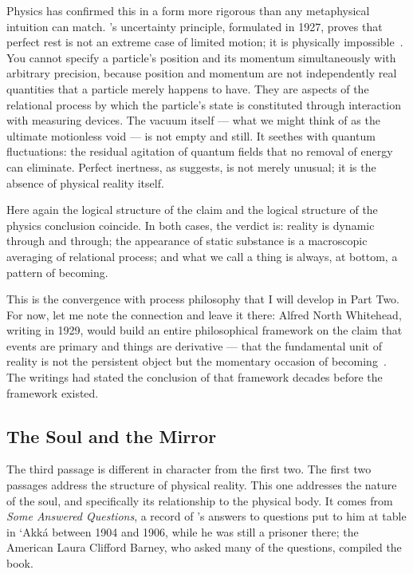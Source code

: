 Physics has confirmed this in a form more rigorous than any metaphysical
intuition can match.
\citeauthor{Heisenberg1927}'s uncertainty principle, formulated in 1927,
proves that perfect rest is not an extreme case of limited motion;
it is physically impossible~\citeyearpar{Heisenberg1927}.
You cannot specify a particle's position and its momentum simultaneously
with arbitrary precision, because position and momentum are not
independently real quantities that a particle merely happens to have.
They are aspects of the relational process by which the particle's state
is constituted through interaction with measuring devices.
The vacuum itself --- what we might think of as the ultimate motionless
void --- is not empty and still.
It seethes with quantum fluctuations: the residual agitation of quantum
fields that no removal of energy can eliminate.
Perfect inertness, as \AbdulBaha suggests, is not merely unusual; it is
the absence of physical reality itself.

Here again the logical structure of the \bahai claim and the logical
structure of the physics conclusion coincide.
In both cases, the verdict is: reality is dynamic through and through;
the appearance of static substance is a macroscopic averaging of
relational process; and what we call a thing is always, at bottom,
a pattern of becoming.

This is the convergence with process philosophy that I will develop
in Part Two.
For now, let me note the connection and leave it there: Alfred North
Whitehead, writing in 1929, would build an entire philosophical
framework on the claim that events are primary and things are derivative
--- that the fundamental unit of reality is not the persistent object
but the momentary occasion of becoming~\citeyearpar{Whitehead1929}.
The \bahai writings had stated the conclusion of that framework decades
before the framework existed.

\subsection{The Soul and the Mirror}
\label{subsec:ch3-passage3}

The third passage is different in character from the first two.
The first two passages address the structure of physical reality.
This one addresses the nature of the soul, and specifically its relationship
to the physical body.
It comes from \textit{Some Answered Questions}, a record of \AbdulBaha's
answers to questions put to him at table in `Akká between 1904 and 1906,
while he was still a prisoner there; the American \bahai Laura Clifford
Barney, who asked many of the questions, compiled the book.

